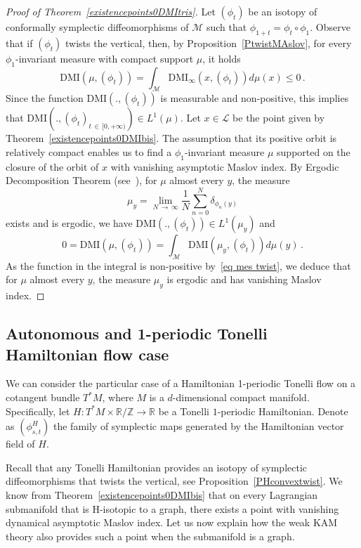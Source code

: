 \documentclass[AHL, Unicode, longabstracts, published]{cedram}
\newcommand*\M{\mathcal{M}}
\newcommand*\cl{\mathcal{L}}
\newcommand{\DMI}{\mathrm{DMI}}
\newcommand*\R{\mathbb{R}}
\newcommand*\Z{\mathbb{Z}}
\begin{document}
\begin{proof}[Proof of Theorem~\ref{existencepoints0DMItris}]
Let $(\phi_t)$ be an isotopy of conformally symplectic diffeomorphisms of $\M$ such that $\phi_{1+t}=\phi_t\circ\phi_1$. Observe that if $(\phi_t)$ twists the vertical, then, by Proposition~\ref{PtwistMAslov}, for every $\phi_1$-invariant measure with compact support $\mu$, it holds
\begin{equation}\label{eq mes twist}
\DMI(\mu,(\phi_t))=\int_\M \DMI_\infty(x,(\phi_t))d\mu(x) \leq 0\,.
\end{equation}
 Since the function $\DMI(.,(\phi_t))$ is measurable and non-positive, this implies that $\DMI(.,(\phi_t)_{t\,\in\,[0,+\infty)})\in L^1(\mu)$.\newline
Let $x\in\cl$ be the point given by Theorem~\ref{existencepoints0DMIbis}. The assumption that its positive orbit is relatively compact enables us to find a $\phi_1$-invariant measure $\mu$ supported on the closure of the orbit of $x$ with vanishing asymptotic Maslov index.\newline
By Ergodic Decomposition Theorem (see~\cite{Mane1987}), for $\mu$ almost every $y$, the measure
\[
\mu_y=\lim_{N\,\to\,\infty}\frac{1}{N}\sum_{n=0}^N\delta_{\phi_n(y)}
\]
exists and is ergodic, we have $\DMI(.,(\phi_t))\in L^1(\mu_y)$ and
\[
0=\DMI(\mu,(\phi_t))=\int_{\M}\DMI(\mu_y,(\phi_t))d\mu(y)\,.
\]
As the function in the integral is non-positive by~\eqref{eq mes twist}, we deduce that for $\mu$ almost every $y$, the measure $\mu_y$ is ergodic and has vanishing Maslov index.
\end{proof}


\subsection{Autonomous and 1-periodic Tonelli Hamiltonian flow case}

We can consider the particular case of a Hamiltonian 1-periodic Tonelli flow on a cotangent bundle $T^*M$, where $M$ is a $d$-dimensional compact manifold. Specifically, let $H:T^*M\times \R/\Z\to \R$ be a Tonelli $1$-periodic Hamiltonian. Denote as $(\phi^H_{s,t})$ the family of symplectic maps generated by the Hamiltonian vector field of $H$.



Recall that any Tonelli Hamiltonian provides an isotopy of symplectic diffeomorphisms that twists the vertical, see Proposition~\ref{PHconvextwist}. We know from Theorem~\ref{existencepoints0DMIbis} that on every Lagrangian submanifold that is {H-isotopic to a graph}, there exists a point with vanishing dynamical asymptotic Maslov index. Let us now explain how the weak KAM theory also provides such a point when the submanifold is a graph.
\end{document}
